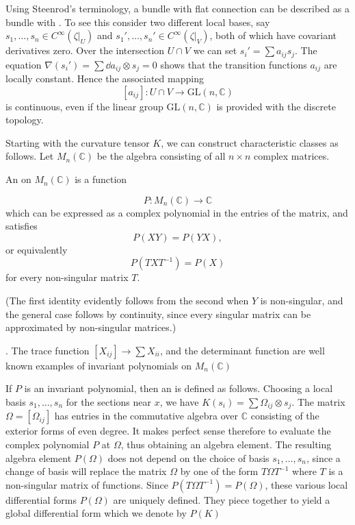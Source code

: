\documentclass[../main]{subfiles}
\begin{document}
\begin{remark*}
Using Steenrod's terminology, a bundle with flat connection can be described as a bundle with . To see this consider two different local bases, say $s_1,\dots,s_n \in C^{\infty}(\zeta|_U)$ and $s_1',\dots,s_n' \in C^{\infty}(\zeta|_V)$, both of which have covariant derivatives zero. Over the intersection $U\cap V$ we can set $s_i'=\sum a_{ij}s_j$. The equation $\nabla(s_i')=\sum \dd a_{ij}\otimes s_j=0$ shows that the transition functions $a_{ij}$ are locally constant. Hence the associated mapping
\[
[a_{ij}]:U \cap V \to \text{GL}(n,\mathbb C)
\]
is continuous, even if the linear group $\text{GL}(n,\mathbb C)$ is provided with the discrete topology.
\end{remark*}

Starting with the curvature tensor $K$, we can construct characteristic classes as follows. Let $M_n(\mathbb C)$ be the algebra consisting of all $n\times n$ complex matrices.

\begin{definition}
An  on $M_n(\mathbb C)$ is a function

\[
P:M_n(\mathbb C) \to \mathbb C
\]
which can be expressed as a complex polynomial in the entries of the matrix, and satisfies
\[
P(XY) = P(YX),
\]
or equivalently 
\[ 
P(TXT^{-1})=P(X)
\]
for every non-singular matrix $T$.
\end{definition}

(The first identity evidently follows from the second when $Y$ is non-singular, and the general case follows by continuity, since every singular matrix can be approximated by non-singular matrices.)

. The trace function $[X_{ij}] \to \sum X_{ii}$, and the determinant function are well known examples of invariant polynomials on $M_n(\mathbb C)$

If $P$ is an invariant polynomial, then an  is defined as follows. Choosing a local basis $s_1,\dots,s_n$ for the sections near $x$, we have $K(s_i)=\sum \Omega_{ij}\otimes s_j$. The matrix $\Omega=[\Omega_{ij}]$ has entries in the commutative algebra over $\mathbb C$ consisting of the exterior forms of even degree. It makes perfect sense therefore to evaluate the complex polynomial $P$ at $\Omega$, thus obtaining an algebra element. The resulting algebra element $P(\Omega)$ does not depend on the choice of basis $s_1,\dots,s_n$, since a change of basis will replace the matrix $\Omega$ by one of the form $T\Omega T^{-1}$ where $T$ is a non-singular matrix of functions. Since $P(T\Omega T^{-1})=P(\Omega)$, these various local differential forms $P(\Omega)$ are uniquely defined. They piece together to yield a global differential form which we denote by $P(K)$
\end{document}
